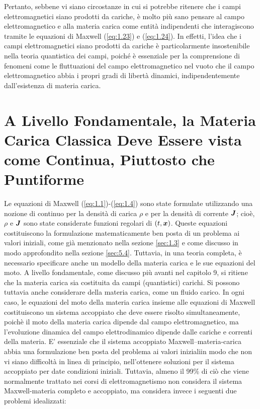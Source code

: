 Pertanto, sebbene vi siano circostanze in cui si potrebbe ritenere che i campi elettromagnetici siano prodotti da cariche, è molto più sano pensare al campo elettromagnetico e alla materia carica come entità indipendenti che interagiscono tramite le equazioni di Maxwell (\ref{eq:1.23}) e (\ref{eq:1.24}). In effetti, l'idea che i campi elettromagnetici siano prodotti da cariche è particolarmente insostenibile nella teoria quantistica dei campi, poiché è essenziale per la comprensione di fenomeni come le fluttuazioni del campo elettromagnetico nel vuoto che il campo elettromagnetico abbia i propri gradi di libertà dinamici, indipendentemente dall'esistenza di materia carica.

\section{A Livello Fondamentale, la Materia Carica Classica Deve Essere vista come Continua, Piuttosto che Puntiforme}\label{sec:1.4}

Le equazioni di Maxwell (\ref{eq:1.1})-(\ref{eq:1.4}) sono state formulate utilizzando una nozione di continuo per la densità di carica $\rho$ e per la densità di corrente $\vb*{J}$; cioè, $\rho$ e  $\vb*{J}$ sono state considerate funzioni regolari di $(t, \vb*{x})$. Queste equazioni costituiscono la formulazione matematicamente ben posta di un problema ai valori iniziali, come già menzionato nella sezione \ref{sec:1.3} e come discusso in modo approfondito nella sezione \ref{sec:5.4}. Tuttavia, in una teoria completa, è necessario specificare anche un modello della materia carica e le sue equazioni del moto. A livello fondamentale, come discusso più avanti nel capitolo 9, si ritiene che la materia carica sia costituita da campi (quantistici) carichi.  Si possono tuttavia anche considerare  della materia carica, come un fluido carico. In ogni caso, le equazioni del moto della materia carica insieme alle equazioni di Maxwell costituiscono un sistema accoppiato che deve essere risolto simultaneamente, poichè il moto della materia carica dipende dal campo elettromagnetico, ma l'evoluzione dinamica del campo elettrodinamico dipende dalle cariche e correnti della materia. E' essenziale che il sistema accoppiato Maxwell--materia-carica abbia una formulazione ben posta del problema ai valori inizialiin modo che non vi siano difficoltà in linea di principio, nell'ottenere soluzioni per il sistema accoppiato per date condizioni iniziali. Tuttavia, almeno il 99\% di ciò che viene normalmente trattato nei corsi di elettromagnetismo non considera il sistema Maxwell-materia completo e accoppiato, ma considera invece i seguenti due problemi idealizzati:

